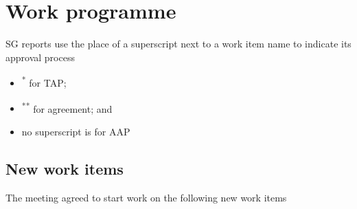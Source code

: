 
\section{Work programme}\label{work-programme}

SG\studyGroup{} reports use the place of a superscript next to a work item name to indicate its approval process

\begin{itemize}
    \item \textsuperscript{*} for TAP;
    \item \textsuperscript{**} for agreement; and
    \item no superscript is for AAP
\end{itemize}

\subsection{New work items}\label{new-work-items}

The meeting agreed to start work on the following new work items

